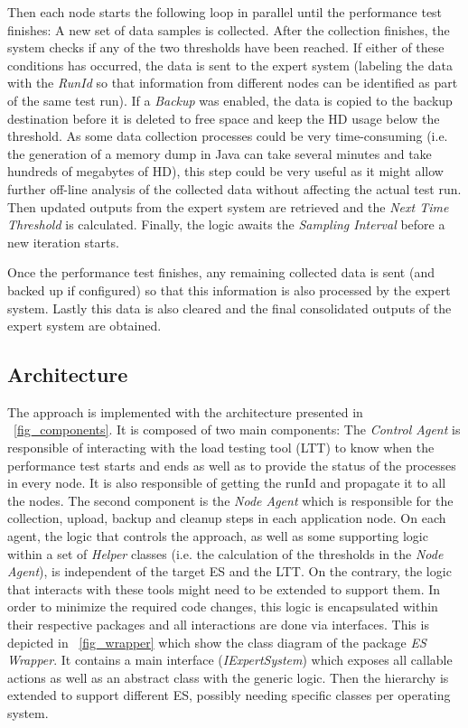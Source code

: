 \documentclass[runningheads,a4paper]{llncs}
\begin{document}
Then each node starts the following loop in parallel until the performance test
finishes: A new set of data samples is collected. After the collection finishes,
the system checks if any of the two thresholds have been reached. If either of
these conditions has occurred, the data is sent to the expert system (labeling the 
data with the \emph{RunId} so that information from different nodes can be
identified as part of the same test run). If a \emph{Backup} was enabled, the data 
is copied to the backup destination before it is deleted to free space and keep
the HD usage below the threshold. As some data collection processes could be
very time-consuming (i.e. the generation of a memory dump in Java can take
several minutes and take hundreds of megabytes of HD), this step could be very
useful as it might allow further off-line analysis of the collected data
without affecting the actual test run. Then updated outputs
from the expert system are retrieved and the \emph{Next Time Threshold} is calculated. 
Finally, the logic awaits the \emph{Sampling Interval} before a new iteration
starts.

Once the performance test finishes, any remaining collected data is sent (and
backed up if configured) so that this information is also processed by the
expert system. Lastly this data is also cleared and the final consolidated
outputs of the expert system are obtained.

\vspace{-7pt}
\subsection{Architecture}
\vspace{-7pt}
The approach is implemented with the architecture
presented in \figurename ~\ref{fig_components}. It is composed of two main components:
The \emph{Control Agent} is responsible of interacting with the load
testing tool (LTT) to know when the performance test starts and ends as well as
to provide the status of the processes in every node. It is also responsible of
getting the runId and propagate it to all the nodes. The second component is the
\emph{Node Agent} which is responsible for the collection, upload, backup and cleanup steps 
in each application node. On each agent, the logic that controls the
approach, as well as some supporting logic within a set of \emph{Helper} classes
(i.e. the calculation of the thresholds in the \emph{Node Agent}), is
independent of the target ES and the LTT. On the contrary, the logic that interacts with these
tools might need to be extended to support them. In order to minimize the
required code changes, this logic is encapsulated within their respective
packages and all interactions are done via interfaces. This is depicted in
\figurename ~\ref{fig_wrapper} which show the class diagram of the package \emph{ES Wrapper}. 
It contains a main interface (\emph{IExpertSystem}) which exposes all callable
actions as well as an abstract class with the generic logic. Then the hierarchy
is extended to support different ES, possibly needing specific classes per
operating system.
\end{document}
